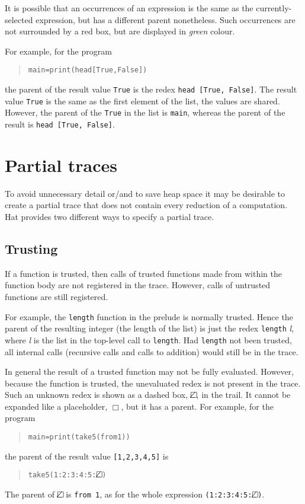 \documentclass[12pt]{article}
\newenvironment{code}{\begin{quote}\begin{alltt}}{\end{alltt}\end{quote}}
\newcommand{\emptyBox}{\Box}
\newcommand{\dashedBox}{\Box\hspace{-9pt}\angle}
\begin{document}
It is possible that an occurrences of an expression is the same as the currently-selected expression, but has a different parent nonetheless. Such occurrences are not surrounded by a red box, but are displayed in \emph{green} colour.

For example, for the program
\begin{code}
main = print (head [True, False])
\end{code}
the parent of the result value \texttt{True} is the redex
\texttt{head [True, False]}. The result value \texttt{True} is the same as the first element of the list, the values are shared. However, the parent of the \texttt{True} in the list is \texttt{main}, whereas the parent of the result is \texttt{head [True, False]}.




\section{Partial traces}

To avoid unnecessary detail or/and to save heap space it may be desirable to create a partial trace that does not contain every reduction of a computation.
Hat provides two different ways to specify a partial trace.


\subsection{Trusting}\label{trusting}

If a function is trusted, then calls of trusted functions made from within the function body are not registered in the trace. However, calls of untrusted functions are still registered.

For example, the \texttt{length} function in the prelude is normally trusted. Hence the parent of the resulting integer (the length of the list) is just the redex \texttt{length} \emph{l}, where \emph{l} is the list in the top-level call to \texttt{length}. Had \texttt{length} not been trusted, all internal calls (recursive calls and calls to addition) would still be in the trace.

In general the result of a trusted function may not be fully evaluated. However, because the function is trusted, the unevaluated redex is not present in the trace. Such an unknown redex is shown as a dashed box, $\dashedBox$, in the trail. It cannot be expanded like a placeholder, $\emptyBox$, but it has a parent.
For example, for the program
\begin{code}
main = print (take 5 (from 1))
\end{code}  
the parent of the result value \texttt{[1,2,3,4,5]} is
\begin{code}
take 5 (1:2:3:4:5:\(\dashedBox\))
\end{code}
The parent of $\dashedBox$ is \texttt{from 1}, as for the whole expression
\texttt{(1:2:3:4:5:\(\dashedBox\))}.
\end{document}
